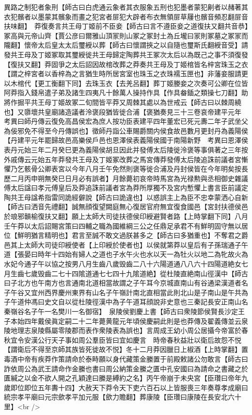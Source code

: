 異路之制犯者象刑【師古曰白虎通云象者其衣服象五刑也犯墨者蒙犯劓者以赭著其衣犯髕者以墨蒙其髕象而畫之犯宮者屝犯大辟者布衣無領屝草屨也髕音頻忍翻屝音扶味翻】　莽復奏言共王母丁姬前不臣妾【師古曰言不遵臣妾之道復扶又翻共音恭】冢高與元帝山齊【賈公彦曰爾雅山頂冡則山冢之冢封土為丘壠曰冡則冢墓之冢冡而隴翻】懷帝太后皇太太后璽綬以葬【師古曰懷謂挾之以自隨也璽斯氏翻綬音受】請發共王母及丁姬冢取其璽綬徙共王母歸定陶葬共王冢次太后以為既己之事不須復發【復扶又翻】莽固爭之太后詔因故棺改葬之莽奏共王母及丁姬棺皆名梓宮珠玉之衣【謂之梓宮者以香梓為之言猶生時所居宮室也珠玉之衣珠襦玉匣也】非藩妾服請更以木棺代【更工衡翻下同】去珠玉衣【去羌呂翻】葬丁姬媵妾之次奏可公卿在位皆阿莽指入錢帛遣子弟及諸生四夷凡十餘萬人操持作具【作具畚鍤之類操七刀翻】助將作掘平共王母丁姬故冢二旬間皆平莽又周棘其處以為世戒云【師古曰以棘周繞也】又隳壞共皇廟諸造議者泠褒段猶皆徙合浦【褒猶奏見三十三卷哀帝建平元年　考異曰師丹傳云復免高昌侯宏為庶人按功臣表建平四年董宏已死元夀二年子武坐父為佞邪免不得至今丹傳誤也】徵師丹詣公車賜爵關内侯食故邑數月更封丹為義陽侯【丹建平元年罷歸故邑高樂侯戶邑也恩澤侯表義陽侯國于南陽新野　考異曰恩澤侯表丹元始三年二月癸巳更為義陽侯胡旦因此并發傅太后陵徙泠褒等事俱著之三年按外戚傳云元始五年莽發共王母及丁姬冢改葬之馬宮傳莽發傅太后陵追誅前議者宮慚懼乃乞骸骨公卿表宮以今年八月壬午免然則褒等徙合浦及丹封侯皆在今年明矣按長歷二月丙申朔無癸巳日月必有誤者】月餘薨初哀帝時馬宮為光禄勲與丞相御史雜議傅太后諡曰孝元傅皇后及莽追誅前議者宮為莽所厚獨不及宮内慙懼上書言臣前議定陶共王母諡希指雷同詭經僻說【師古曰詭違也】以惑誤主上為臣不忠幸蒙洒心自新【師古曰洒音先禮翻】誠無顔復望闕庭無心復居官府無宜復食國邑【宮封扶德侯邑於琅邪贑榆復扶又翻】願上太師大司徒扶德侯印綬避賢者路【上時掌翻下同】八月壬午莽以太后詔賜宮策曰四輔之職為國維綱三公之任鼎足承君不有鮮明固守無以居位【鮮明猶言精明也】君言至誠不敢文過朕甚多之【師古曰多猶重也】不奪君之爵邑其上太師大司徒印綬使者【上印綬於使者也】以侯就第莽以皇后有子孫瑞通子午道【張晏曰時年十四始有婦人之道也子水午火也水以天一為牡火以地二為牝故火為水妃今通子午以協之按男八月生齒八歲毁齒二八十六陽道通八八六十四陽道絶女七月生齒七歲毁齒二七十四隂道通七七四十九隂道絶】從杜陵直絶南山徑漢中【師古曰子北方也午南方也言通南北道相當故謂之子午耳今京城直南山有谷通梁漢道者名子午谷又宜州西界慶州東界有山名子午嶺計南北直相當此則北山是子南山是午共為子午道仲馮曰史文自以從杜陵徑漢中為子午道耳顔說非史意也三秦記長安正南山名秦嶺谷名子午一名樊川一名御宿】　泉陵侯劉慶上書【師古曰衆陵節侯賢長沙定王子本始四年戴侯眞定嗣二十二年薨黄龍元年頃侯慶嗣此則是也莽傳及翟義傳並云泉陵地理志泉陵縣屬零陵郡而表作衆陵表為誤也】言周成王幼小周公居攝今帝富於春秋宜令安漢公行天子事如周公羣臣皆曰宜如慶言　時帝春秋益壯以衛后故怨不悦【謂衛后不得至京師其族皆死徙故不悦】冬十二月莽因臘日上椒酒【上時掌翻】置毒酒中帝有疾莽作策請命於泰畤願以身代藏策金縢置于前殿敕諸公勿敢言【師古曰詐依周公為武王請命作金縢也書曰周公納策金縢之匱中孔安國曰為請命之書藏之於匱緘之以金不欲人開之孔穎達曰縢是縛約之名】丙午帝崩于未央宮【臣瓚曰帝年九歲即位即位五年夀十四】大赦天下莽令天下吏六百石以上皆服喪三年奏尊孝成廟曰統宗孝平廟曰元宗歛孝平加元服【歛力贍翻】葬康陵【臣瓚曰康陵在長安北六十里】<br />
